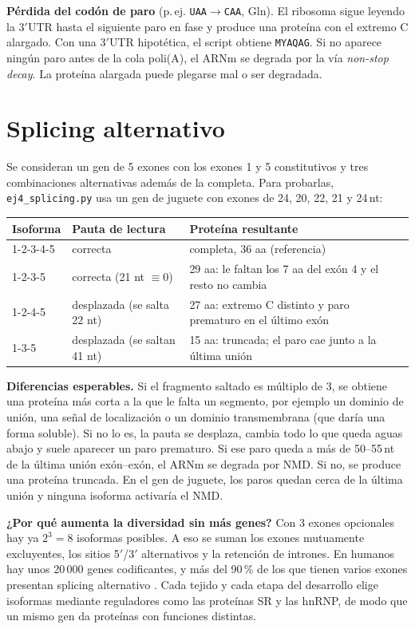 \documentclass[11pt,a4paper]{article}
\newcommand{\sq}[1]{\texttt{#1}}
\begin{document}
\textbf{Pérdida del codón de paro} (p.\,ej. \sq{UAA}$\to$\sq{CAA}, Gln). El ribosoma sigue leyendo la 3$'$UTR hasta el siguiente paro en fase y produce una proteína con el extremo C alargado. Con una 3$'$UTR hipotética, el script obtiene \sq{MYAQAG}. Si no aparece ningún paro antes de la cola poli(A), el ARNm se degrada por la vía \emph{non-stop decay}. La proteína alargada puede plegarse mal o ser degradada.

\section{Splicing alternativo}
Se consideran un gen de 5 exones con los exones 1 y 5 constitutivos y tres combinaciones alternativas además de la completa. Para probarlas, \sq{ej4\_splicing.py} usa un gen de juguete con exones de 24, 20, 22, 21 y 24\,nt:
\begin{center}\small
\begin{tabularx}{\linewidth}{llX}
\toprule
Isoforma & Pauta de lectura & Proteína resultante \\
\midrule
1-2-3-4-5 & correcta & completa, 36 aa (referencia)\\
1-2-3-5 & correcta (21 nt $\equiv 0$) & 29 aa: le faltan los 7 aa del exón 4 y el resto no cambia \\
1-2-4-5 & desplazada (se salta 22 nt) & 27 aa: extremo C distinto y paro prematuro en el último exón \\
1-3-5 & desplazada (se saltan 41 nt) & 15 aa: truncada; el paro cae junto a la última unión \\
\bottomrule
\end{tabularx}
\end{center}
\textbf{Diferencias esperables.} Si el fragmento saltado es múltiplo de 3, se obtiene una proteína más corta a la que le falta un segmento, por ejemplo un dominio de unión, una señal de localización o un dominio transmembrana (que daría una forma soluble). Si no lo es, la pauta se desplaza, cambia todo lo que queda aguas abajo y suele aparecer un paro prematuro. Si ese paro queda a más de 50--55\,nt de la última unión exón--exón, el ARNm se degrada por NMD. Si no, se produce una proteína truncada. En el gen de juguete, los paros quedan cerca de la última unión y ninguna isoforma activaría el NMD.

\textbf{¿Por qué aumenta la diversidad sin más genes?} Con 3 exones opcionales hay ya $2^3=8$ isoformas posibles. A eso se suman los exones mutuamente excluyentes, los sitios 5$'$/3$'$ alternativos y la retención de intrones. En humanos hay unos 20\,000 genes codificantes, y más del 90\,\% de los que tienen varios exones presentan splicing alternativo \cite{wang,pan}. Cada tejido y cada etapa del desarrollo elige isoformas mediante reguladores como las proteínas SR y las hnRNP, de modo que un mismo gen da proteínas con funciones distintas.
\end{document}
